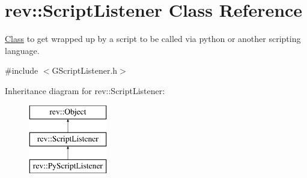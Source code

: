 \hypertarget{classrev_1_1_script_listener}{}\section{rev\+::Script\+Listener Class Reference}
\label{classrev_1_1_script_listener}


\mbox{\hyperlink{struct_class}{Class}} to get wrapped up by a script to be called via python or another scripting language.  




{\ttfamily \#include $<$G\+Script\+Listener.\+h$>$}

Inheritance diagram for rev\+::Script\+Listener\+:\begin{figure}[H]
\begin{center}
\leavevmode
\includegraphics[height=3.000000cm]{classrev_1_1_script_listener}
\end{center}
\end{figure}
